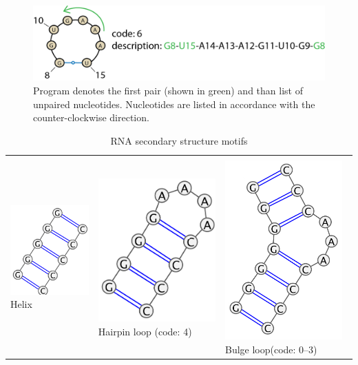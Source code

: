 \documentclass[12pt]{article}
\begin{document}
\begin{figure}[h!]
\centering
\includegraphics[width = \textwidth]{./pictures/motifs_description.png}
\caption{Program denotes the first pair (shown in green) and than list of unpaired nucleotides. Nucleotides are listed in accordance with the counter-clockwise direction.}
\label{MotifDesc}
\end{figure}

\begin{table}
\caption{RNA secondary structure motifs}
\label{RNAsecondaryStructures}
\begin{tabular}
{ >{\centering} p{5.5cm} >{\centering} p{5.5cm} >{\centering} p{5.5cm}}
&& \tabularnewline
 \includegraphics[width=4.5cm]{./pictures/helix_varna.PNG}  \linebreak Helix 
 & \includegraphics[width=4.5cm]{./pictures/hairpin_varna.PNG}  Hairpin loop \linebreak (code: 4) &  \includegraphics[width=4.5cm]{./pictures/bulge_varna.PNG} Bulge loop\linebreak  (code: 0--3) \tabularnewline

\end{tabular}
\end{table}
\end{document}
